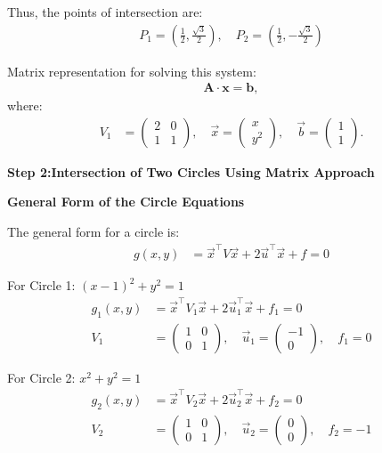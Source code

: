 \documentclass[journal]{IEEEtran}
\begin{document}
Thus, the points of intersection are:
\begin{align}
    P_1 = \left(\frac{1}{2}, \frac{\sqrt{3}}{2}\right), \quad P_2 = \left(\frac{1}{2}, -\frac{\sqrt{3}}{2}\right)
\end{align}

Matrix representation for solving this system:
\begin{align}
    \bm{A} \cdot \bm{x} = \bm{b},
\end{align}
where:
\begin{align}
    V_1 &= \begin{pmatrix} 2 & 0 \\ 1 & 1 \end{pmatrix}, \quad
    \vec{x} = \begin{pmatrix} x \\ y^2 \end{pmatrix}, \quad
    \vec{b} = \begin{pmatrix} 1 \\ 1 \end{pmatrix}.
\end{align}

\textbf{Step 2:Intersection of Two Circles Using Matrix Approach}

\textbf{ General Form of the Circle Equations}

The general form for a circle is:
\begin{align}
    g(x, y) &= \vec{x}^\top V \vec{x} + 2 \vec{u}^\top \vec{x} + f = 0
\end{align}

For Circle 1: \( (x - 1)^2 + y^2 = 1 \)
\begin{align}
    g_1(x, y) &= \vec{x}^\top V_1 \vec{x} + 2 \vec{u}_1^\top \vec{x} + f_1 = 0 \\
    V_1 &= \begin{pmatrix} 1 & 0 \\ 0 & 1 \end{pmatrix}, \quad
    \vec{u}_1 = \begin{pmatrix} -1 \\ 0 \end{pmatrix}, \quad
    f_1 = 0
\end{align}

For Circle 2: \( x^2 + y^2 = 1 \)
\begin{align}
    g_2(x, y) &= \vec{x}^\top V_2 \vec{x} + 2 \vec{u}_2^\top \vec{x} + f_2 = 0 \\
    V_2 &= \begin{pmatrix} 1 & 0 \\ 0 & 1 \end{pmatrix}, \quad
    \vec{u}_2 = \begin{pmatrix} 0 \\ 0 \end{pmatrix}, \quad
    f_2 = -1
\end{align}
\end{document}
